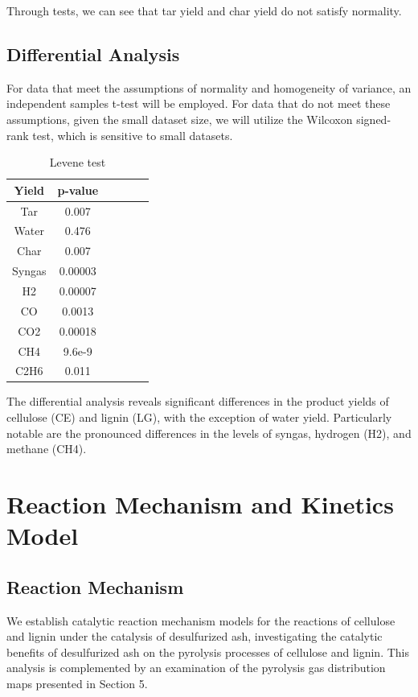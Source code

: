 \documentclass{swmcmthesis}
\begin{document}
Through tests, we can see that tar yield and char yield do not satisfy normality.

\subsection{Differential Analysis}

For data that meet the assumptions of normality and homogeneity of variance, an independent samples t-test will be employed. For data that do not meet these assumptions, given the small dataset size, we will utilize the Wilcoxon signed-rank test, which is sensitive to small datasets.

\begin{table}[h!t]
    \centering
    \caption{Levene test}
    \label{tbl:label}
    \begin{tabular}{cccccc}
    \toprule
    Yield & p-value  \\
    \midrule
    Tar & 0.007  \\
    Water & 0.476 \\
    Char & 0.007 \\
    Syngas & 0.00003 \\
    H2 &  0.00007\\
    CO & 0.0013\\
    CO2 &  0.00018 \\
    CH4 &   9.6e-9\\
    C2H6 &  0.011\\

    \bottomrule
    \end{tabular}
\end{table}

The differential analysis reveals significant differences in the product yields of cellulose (CE) and lignin (LG), with the exception of water yield. Particularly notable are the pronounced differences in the levels of syngas, hydrogen (H2), and methane (CH4).

\section{Reaction Mechanism and Kinetics Model}

\subsection{Reaction Mechanism}

We establish catalytic reaction mechanism models for the reactions of cellulose and lignin under the catalysis of desulfurized ash, investigating the catalytic benefits of desulfurized ash on the pyrolysis processes of cellulose and lignin. This analysis is complemented by an examination of the pyrolysis gas distribution maps presented in Section 5.
\end{document}
